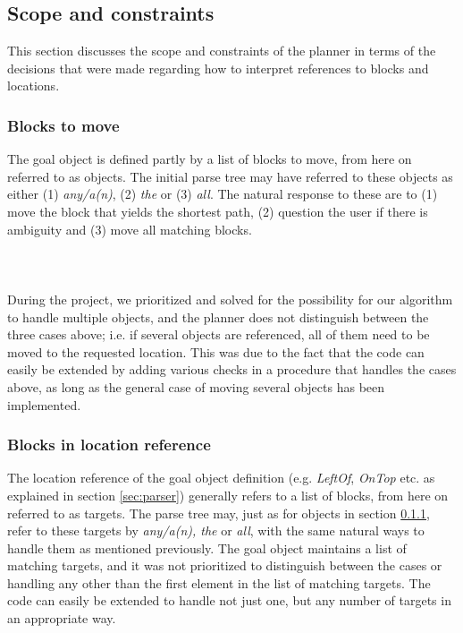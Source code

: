 \subsection{Scope and constraints}
This section discusses the scope and constraints of the planner in terms of the
decisions that were made regarding how to interpret references to blocks and
locations.

\subsubsection{Blocks to move} 
\label{sec:blockstomove}
The goal object is defined partly by a list of blocks to move, from here on
referred to as objects. The initial parse tree may have referred to these
objects as either (1) \textit{any/a(n)}, (2) \textit{the} or (3) \textit{all}.
The natural response to these are to (1) move the block that yields the shortest
path, (2) question the user if there is ambiguity and (3) move all matching
blocks.
\\\\\\\\
During the project, we prioritized and solved for the possibility for our
algorithm to handle multiple objects, and the planner does not distinguish
between the three cases above; i.e. if several objects are referenced, all of
them need to be moved to the requested location. This was due to the fact that
the code can easily be extended by adding various checks in a procedure that
handles the cases above, as long as the general case of moving several objects
has been implemented.

\subsubsection{Blocks in location reference}
The location reference of the goal object definition (e.g. \textit{LeftOf},
\textit{OnTop} etc. as explained in section \ref{sec:parser}) generally refers
to a list of blocks, from here on referred to as targets. The parse tree may,
just as for objects in section \ref{sec:blockstomove}, refer to these targets by
\textit{any/a(n), the} or \textit{all}, with the same natural ways to handle
them as mentioned previously. The goal object maintains a list of matching
targets, and it was not prioritized to distinguish between the cases or handling
any other than the first element in the list of matching targets. The code can
easily be extended to handle not just one, but any number of targets in an
appropriate way.

